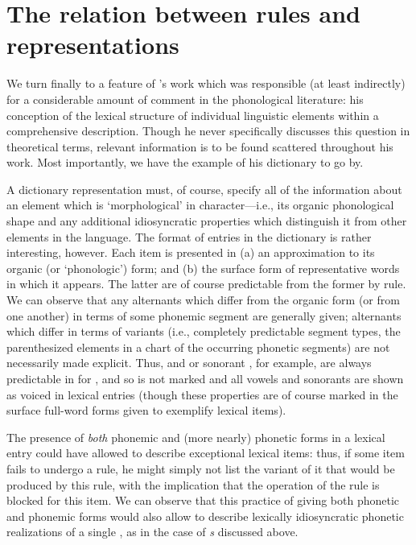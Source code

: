 \section{The relation between rules and representations}

We turn finally to a feature of {\Sapir}'s work which was responsible (at
least indirectly) for a considerable amount of comment in the
phonological literature: his conception of the lexical structure of
individual linguistic elements within a comprehensive
description. Though he never specifically discusses this question in
theoretical terms, relevant information is to be found scattered
throughout his work. Most importantly, we have the example of his
 dictionary \citep{sapir31:s.paiute.dict} to go by.

A dictionary representation must, of course, specify all of the
information about an element which is `morphological' in
character—i.e., its organic phonological shape and any additional
idiosyncratic properties which distinguish it from other elements in
the language. The format of entries in the  dictionary
is rather interesting, however. Each item is presented in (a) an
approximation to its organic (or `phonologic') form; and (b) the
surface form of representative words in which it appears. The latter
are of course predictable from the former by rule. We can observe that
any alternants which differ from the organic form (or from one
another) in terms of some phonemic segment are generally given;
alternants which differ in terms of variants (i.e., completely
predictable segment types, the parenthesized elements in a chart of
the occurring phonetic segments) are not necessarily made
explicit. Thus,  and  or sonorant , for example,
are always predictable in  for {\Sapir}, and so  is
not marked and all vowels and sonorants are shown as voiced in lexical
entries (though these properties are of course marked in the surface
full-word forms given to exemplify lexical items).

The presence of \emph{both} phonemic and (more nearly) phonetic forms in a
lexical entry could have allowed {\Sapir} to describe exceptional lexical
items: thus, if some item fails to undergo a rule, he might simply not
list the variant of it that would be produced by this rule, with the
implication that the operation of the rule is blocked for this
item. We can observe that this practice of giving both phonetic and
phonemic forms would also allow {\Sapir} to describe lexically
idiosyncratic phonetic realizations of a single , as in the
case of  \emph{s} discussed above.

